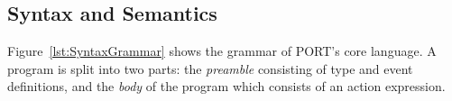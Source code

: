 %
%
%
%
%
%


\subsection{Syntax and Semantics}
\label{sub:SyntaxAndSemantics}

Figure~\ref{lst:SyntaxGrammar} shows the grammar of PORT's core language.
A program is split into two parts: the \emph{preamble} consisting of type and event definitions, and the \emph{body} of the program which consists of an action expression. 


